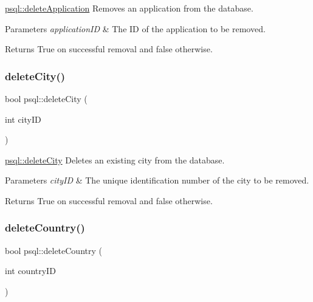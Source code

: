 \mbox{\hyperlink{classpsql_a999ee8e2d813892411ef502ebc055a79}{psql\+::delete\+Application}} Removes an application from the database. 


\begin{DoxyParams}{Parameters}
{\em application\+ID} & The ID of the application to be removed. \\
\hline
\end{DoxyParams}
\begin{DoxyReturn}{Returns}
True on successful removal and false otherwise. 
\end{DoxyReturn}
\mbox{\label{classpsql_aaffd42b26b635d9881daaf5fbf4fd62f}} 
\subsubsection{\texorpdfstring{deleteCity()}{deleteCity()}}
{\footnotesize\ttfamily bool psql\+::delete\+City (\begin{DoxyParamCaption}\item[{int}]{city\+ID }\end{DoxyParamCaption})}



\mbox{\hyperlink{classpsql_aaffd42b26b635d9881daaf5fbf4fd62f}{psql\+::delete\+City}} Deletes an existing city from the database. 


\begin{DoxyParams}{Parameters}
{\em city\+ID} & The unique identification number of the city to be removed. \\
\hline
\end{DoxyParams}
\begin{DoxyReturn}{Returns}
True on successful removal and false otherwise. 
\end{DoxyReturn}
\mbox{\label{classpsql_a914bf8701fbed4ff80edcd0d09c7c3fd}} 
\subsubsection{\texorpdfstring{deleteCountry()}{deleteCountry()}}
{\footnotesize\ttfamily bool psql\+::delete\+Country (\begin{DoxyParamCaption}\item[{int}]{country\+ID }\end{DoxyParamCaption})}



